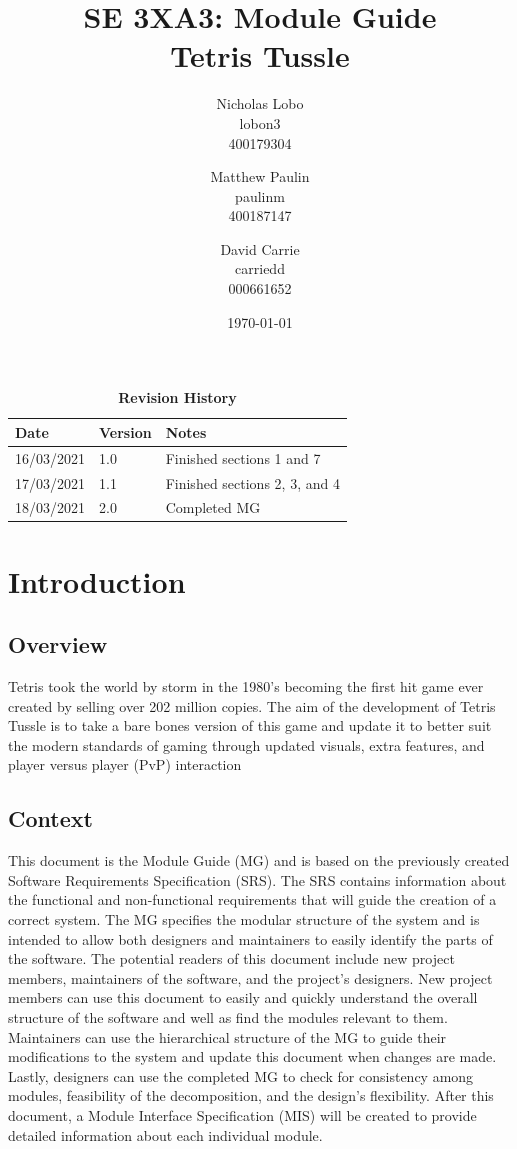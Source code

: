 \documentclass[12pt, titlepage]{article}
\title{SE 3XA3: Module Guide\\Tetris Tussle}
\author{Nicholas Lobo \\ lobon3 \\ 400179304 \and
	Matthew Paulin \\ paulinm \\ 400187147 \and
	David Carrie \\ carriedd \\ 000661652 \and
}
\date{\today}
\begin{document}
\maketitle

\tableofcontents
\listoftables
\listoffigures

\begin{table}[H]
\caption{\bf Revision History}
\begin{tabularx}{\textwidth}{p{3cm}p{2cm}X}
\toprule {\bf Date} & {\bf Version} & {\bf Notes}\\
\midrule
16/03/2021 & 1.0 & Finished sections 1 and 7\\
17/03/2021 & 1.1 & Finished sections 2, 3, and 4\\
18/03/2021 & 2.0 & Completed MG\\
\bottomrule
\end{tabularx}
\end{table}

\newpage


\section{Introduction}
\subsection{Overview}
 Tetris took the world by storm in the 1980’s becoming the first hit game ever created by selling over 202 million copies. The aim of the development of Tetris Tussle is to take a bare bones version of this game and update it to better suit the modern standards of gaming through updated visuals, extra features, and player versus player (PvP) interaction
\subsection{Context}
This document is the Module Guide (MG) and is based on the previously created Software Requirements Specification (SRS). The SRS contains information about the functional and non-functional requirements that will guide the creation of a correct system. The MG specifies the modular structure of the system and is intended to allow both designers and maintainers to easily identify the parts of the software. The potential readers of this document include new project members, maintainers of the software, and the project's designers. New project members can use this document to easily and quickly understand the overall structure of the software and well as find the modules relevant to them. Maintainers can use the hierarchical structure of the MG to guide their modifications to the system and update this document when changes are made. Lastly, designers can use the completed MG to check for consistency among modules, feasibility of the decomposition, and the design's flexibility. After this document, a Module Interface Specification (MIS) will be created to provide detailed information about each individual module.
\end{document}
